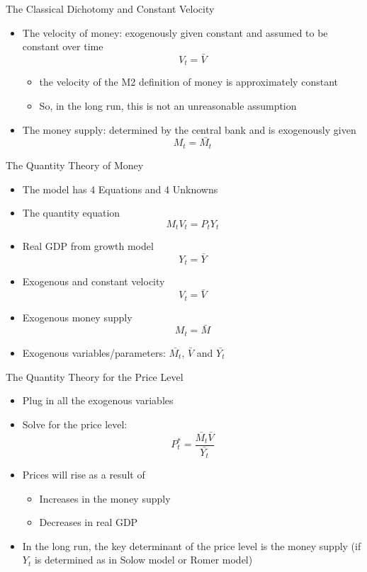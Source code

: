 \documentclass[aspectratio=1610]{beamer}
\begin{document}
\begin{frame}[wide]{The Classical Dichotomy and Constant Velocity}
	\begin{itemize}
		\item 	The velocity of money: exogenously given constant and assumed to be constant over time
		\[V_t = \bar{V}\]
		\begin{itemize}
			\item the velocity of the M2 definition of money is approximately constant
			\item So, in the long run, this is not an unreasonable assumption
		\end{itemize}
		\item The money supply: determined by the central bank and is exogenously given
		\[M_t = \bar{M_t}\]
		
	\end{itemize}
\end{frame}

\begin{frame}[wide]{The Quantity Theory of Money}
	\begin{itemize}
		\item 	The model has 4 Equations and 4 Unknowns
		\item The quantity equation
		\[M_tV_t = P_tY_t\]
		\item Real GDP from growth model
		\[Y_t = \bar{Y}\]
		\item Exogenous and constant velocity
		\[V_t = \bar{V}\]
		\item Exogenous money supply 
		\[M_t = \bar{M}\]
		\item Exogenous variables/parameters: $\bar{M_t}$, $\bar{V}$ and $\bar{Y_t}$
	\end{itemize}
\end{frame}

\begin{frame}[wide]{The Quantity Theory for the Price Level}
	\begin{itemize}
		\item 	Plug in all the exogenous variables
		\item Solve for the price level:
			\[P^*_t = \frac{\bar{M_t} \bar{V}}{\bar{Y_t}}\]
		\item Prices will rise as a result of
		\begin{itemize}
			\item Increases in the money supply
			\item Decreases in real GDP
		\end{itemize}
		\item In the long run, the key determinant of the price level is the money supply (if $Y_t$ is determined as in Solow model or Romer model)
	\end{itemize}
\end{frame}
\end{document}
